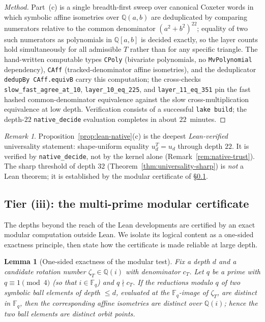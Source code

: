 \documentclass[11pt]{article}
\theoremstyle{plain}
\newtheorem{lemma}[theorem]{Lemma}
\theoremstyle{definition}
\theoremstyle{remark}
\newtheorem{remark}[theorem]{Remark}
\begin{document}
\begin{proof}[Method]
Part~(c) is a single breadth-first sweep over canonical Coxeter words in
which symbolic affine isometries over $\mathbb{Q}(a,b)$ are deduplicated
by comparing numerators relative to the common denominator
$(a^2+b^2)^{22}$; equality of two such numerators as polynomials in
$\mathbb{Q}[a,b]$ is decided exactly, so the layer counts hold
simultaneously for all admissible $T$ rather than for any specific
triangle. The hand-written computable types \texttt{CPoly} (bivariate
polynomials, no \texttt{MvPolynomial} dependency), \texttt{CAff}
(tracked-denominator affine isometries), and the deduplicator
\texttt{dedupBy CAff.equivB} carry this computation; the cross-checks
\texttt{slow\_fast\_agree\_at\_10}, \texttt{layer\_10\_eq\_225}, and
\texttt{layer\_11\_eq\_351} pin the fast hashed common-denominator
equivalence against the slow cross-multiplication equivalence at low
depth. Verification consists of a successful \texttt{lake build}; the
depth-$22$ \texttt{native\_decide} evaluation completes in about
$22$~minutes.
\end{proof}

\begin{remark}
\label{rem:lean-universality}
Proposition~\ref{prop:lean-native}(c) is the deepest
\emph{Lean-verified} universality statement: shape-uniform equality
$u_d^T=u_d$ through depth $22$. It is verified by
\texttt{native\_decide}, not by the kernel alone
(Remark~\ref{rem:native-trust}). The sharp threshold of depth $32$
(Theorem~\ref{thm:universality-sharp}) is \emph{not} a Lean theorem; it is
established by the modular certificate of
\S\ref{ssec:reproduce-modular}.
\end{remark}

\subsection{Tier (iii): the multi-prime modular certificate}
\label{ssec:reproduce-modular}

The depths beyond the reach of the Lean developments are certified by an
exact modular computation outside Lean. We isolate its logical content as
a one-sided exactness principle, then state how the certificate is made
reliable at large depth.

\begin{lemma}[One-sided exactness of the modular test]
\label{lem:one-sided}
Fix a depth $d$ and a candidate rotation number $\zeta_T\in\mathbb{Q}(i)$
with denominator $c_T$. Let $q$ be a prime with $q\equiv 1\pmod 4$
(so that $i\in\mathbb{F}_q$) and $q\nmid c_T$. If the reductions modulo
$q$ of two symbolic ball elements of depth $\le d$, evaluated at the
$\mathbb{F}_q$-image of $\zeta_T$, are \emph{distinct} in $\mathbb{F}_q$,
then the corresponding affine isometries are distinct over
$\mathbb{Q}(i)$; hence the two ball elements are distinct
orbit points.
\end{lemma}
\end{document}
